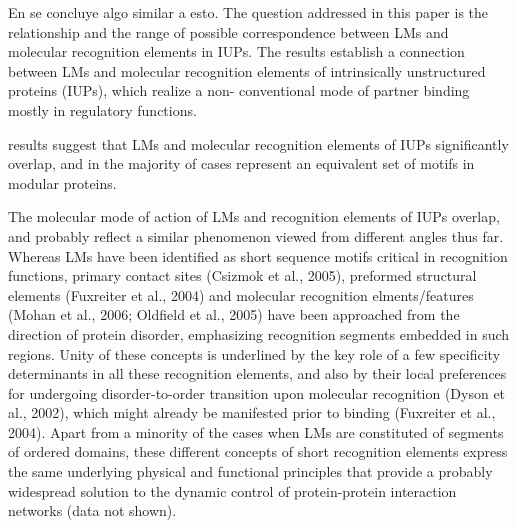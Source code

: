 En \cite{fuxreiter2007local} se concluye algo similar a esto.
The question addressed in
this paper is the relationship and the range of possible
correspondence between LMs and molecular recognition
elements in IUPs.
The results establish a
connection between LMs and molecular recognition elements of
intrinsically unstructured proteins (IUPs), which realize a non-
conventional mode of partner binding mostly in regulatory functions.

results suggest that LMs and molecular recognition
elements of IUPs significantly overlap, and in the majority of
cases represent an equivalent set of motifs in modular proteins.

The molecular mode of action of
LMs and recognition elements of IUPs overlap, and probably
reflect a similar phenomenon viewed from different angles thus
far.
Whereas LMs have been identified as short sequence motifs
critical in recognition functions, primary contact sites (Csizmok
et al., 2005), preformed structural elements (Fuxreiter et al.,
2004) and molecular recognition elments/features (Mohan
et al., 2006; Oldfield et al., 2005) have been approached from
the direction of protein disorder, emphasizing recognition
segments embedded in such regions. Unity of these concepts
is underlined by the key role of a few specificity determinants in
all these recognition elements, and also by their local
preferences for undergoing disorder-to-order transition upon
molecular recognition (Dyson et al., 2002), which might already
be manifested prior to binding (Fuxreiter et al., 2004). Apart
from a minority of the cases when LMs are constituted of
segments of ordered domains, these different concepts of short
recognition elements express the same underlying physical and
functional principles that provide a probably widespread
solution to the dynamic control of protein-protein interaction
networks (data not shown).






